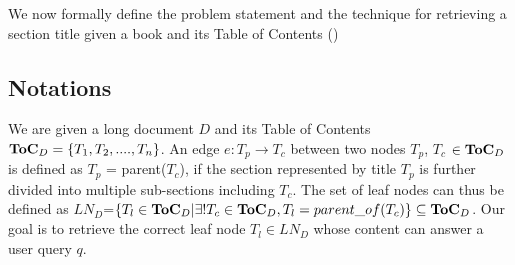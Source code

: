 We now formally define the problem statement and the technique for retrieving a section title given a book and its Table of Contents ({\toc})

\subsection{Notations}
We are given a long document $D$ and its Table of Contents ${{\textbf{{ToC}}}}_D = \{T_{1}, T_{2}, ....,T_{n}\}$. An edge $e: T_{p} \rightarrow T_{c}$ between two nodes $T_{p}$, $T_{c}$ $\in {{\textbf{{ToC}}}}_D$ is defined as $T_{p}$ = parent($T_{c}$), if the section represented by title $T_{p}$ is further divided into multiple sub-sections including $T_{c}$. The set of leaf nodes can thus be defined as $LN_{D}$=$\{T_{l} \in {\textbf{{ToC}}}_{D} | \exists! T_{c} \in {\textbf{{ToC}}}_{D}, T_{l}=parent\_of(T_{c})\} \subseteq {{\textbf{{ToC}}}}_{D}$. Our goal is to retrieve the correct leaf node $T_{l} \in LN_{D}$ whose content can answer a user query $q$.


